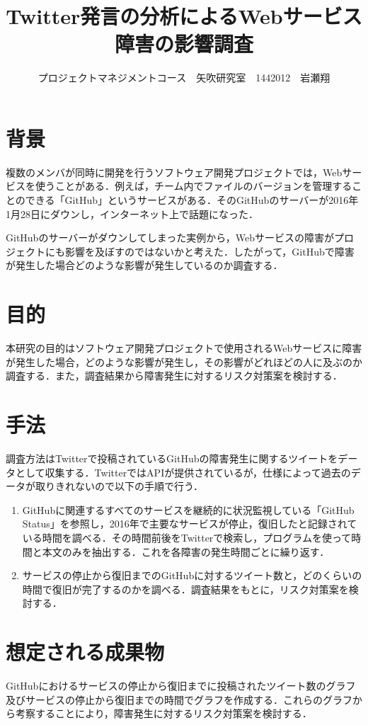 \documentclass[uplatex,twocolumn,dvipdfmx]{jsarticle}
\title{\vspace{-5mm}\fontsize{14pt}{0pt}\selectfont Twitter発言の分析によるWebサービス障害の影響調査}
\author{\normalsize プロジェクトマネジメントコース　矢吹研究室　1442012　岩瀬翔}
\date{}
\begin{document}
\fontsize{10.5pt}{\baselineskip}\selectfont
\maketitle





\section{背景}
複数のメンバが同時に開発を行うソフトウェア開発プロジェクトでは，Webサービスを使うことがある．例えば，チーム内でファイルのバージョンを管理することのできる「GitHub」というサービスがある\cite{01}．そのGitHubのサーバーが2016年1月28日にダウンし，インターネット上で話題になった\cite{02}．

GitHubのサーバーがダウンしてしまった実例から，Webサービスの障害がプロジェクトにも影響を及ぼすのではないかと考えた．したがって，GitHubで障害が発生した場合どのような影響が発生しているのか調査する．
\section{目的}
本研究の目的はソフトウェア開発プロジェクトで使用されるWebサービスに障害が発生した場合，どのような影響が発生し，その影響がどれほどの人に及ぶのか調査する．また，調査結果から障害発生に対するリスク対策案を検討する．
\section{手法}
調査方法はTwitterで投稿されているGitHubの障害発生に関するツイートをデータとして収集する．TwitterではAPIが提供されているが，仕様によって過去のデータが取りきれないので以下の手順で行う．
\begin{enumerate}
 \item GitHubに関連するすべてのサービスを継続的に状況監視している「GitHub Status」を参照し，2016年で主要なサービスが停止，復旧したと記録されている時間を調べる．その時間前後をTwitterで検索し，プログラムを使って時間と本文のみを抽出する．これを各障害の発生時間ごとに繰り返す\cite{03}．
 \item サービスの停止から復旧までのGitHubに対するツイート数と，どのくらいの時間で復旧が完了するのかを調べる．調査結果をもとに，リスク対策案を検討する．
\end{enumerate}
\section{想定される成果物}
GitHubにおけるサービスの停止から復旧までに投稿されたツイート数のグラフ及びサービスの停止から復旧までの時間でグラフを作成する．これらのグラフから考察することにより，障害発生に対するリスク対策案を検討する．
\end{document}

